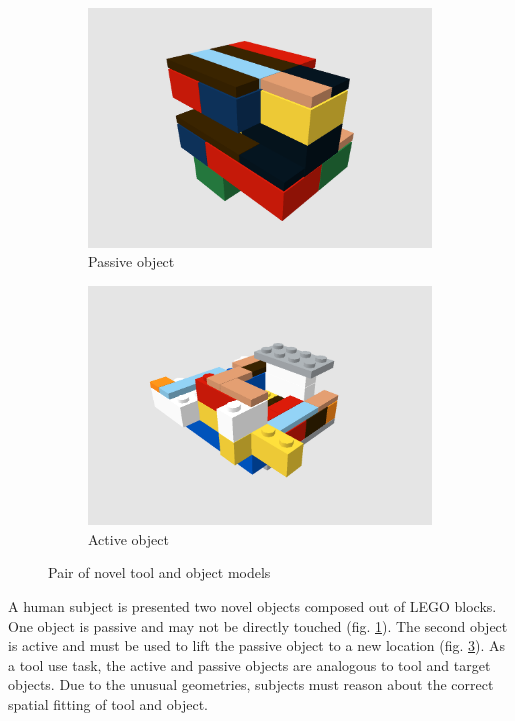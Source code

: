 \documentclass[11]{article}
\begin{document}
\begin{figure}[!h]
  \centering
  \begin{subfigure}{0.49\textwidth}
    \includegraphics[width=1\linewidth]{figures/obj51.png}
    \caption{Passive object}
    \label{fig:obj51}
  \end{subfigure}
  \begin{subfigure}{0.49\textwidth}
    \includegraphics[width=1\linewidth]{figures/obj52.png}
    \caption{Active object}
    \label{fig:obj52}
  \end{subfigure}
  \caption{Pair of novel tool and object models}
\end{figure}

A human subject is presented two novel objects composed out of LEGO blocks.
One object is passive and may not be directly touched (fig. \ref{fig:obj51}).
The second object is active and must be used to lift the passive object to a new location (fig. \ref{fig:obj52}).
As a tool use task, the active and passive objects are analogous to tool and target objects.
Due to the unusual geometries, subjects must reason about the correct spatial fitting of tool and object.    
\end{document}
